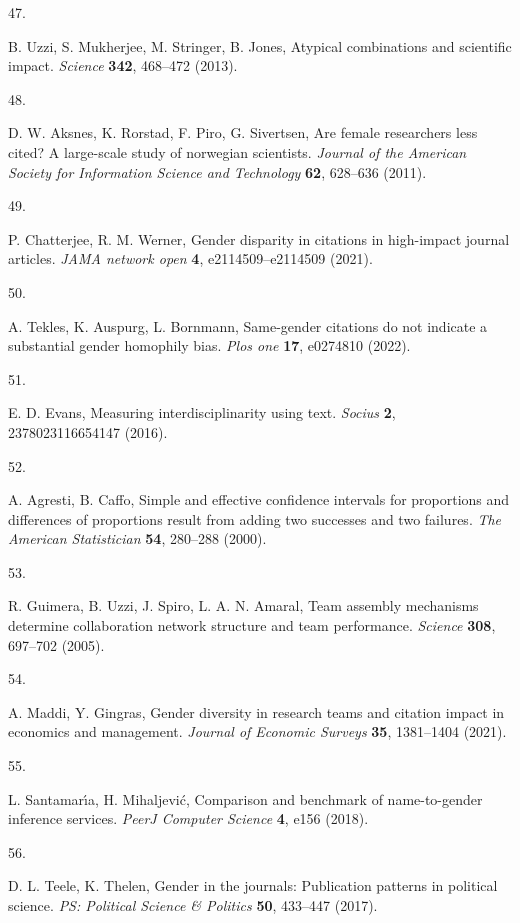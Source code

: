 \documentclass[
  11pt,
]{article}
\newlength{\cslhangindent}
\newlength{\csllabelwidth}
\newenvironment{CSLReferences}[2] %
 {\begin{list}{}{%
  \setlength{\itemindent}{0pt}
  \setlength{\leftmargin}{0pt}
  \setlength{\parsep}{0pt}
  \ifodd #1
   \setlength{\leftmargin}{\cslhangindent}
   \setlength{\itemindent}{-1\cslhangindent}
  \fi
  \setlength{\itemsep}{#2\baselineskip}}}
 {\end{list}}
\newcommand{\CSLLeftMargin}[1]{\parbox[t]{\csllabelwidth}{\strut#1\strut}}
\newcommand{\CSLRightInline}[1]{\parbox[t]{\linewidth - \csllabelwidth}{\strut#1\strut}}
\begin{document}
\begin{CSLReferences}{0}{1}
\CSLLeftMargin{47. }%
\CSLRightInline{B. Uzzi, S. Mukherjee, M. Stringer, B. Jones, Atypical combinations and scientific impact. \emph{Science} \textbf{342}, 468--472 (2013).}

\CSLLeftMargin{48. }%
\CSLRightInline{D. W. Aksnes, K. Rorstad, F. Piro, G. Sivertsen, Are female researchers less cited? A large-scale study of norwegian scientists. \emph{Journal of the American Society for Information Science and Technology} \textbf{62}, 628--636 (2011).}

\CSLLeftMargin{49. }%
\CSLRightInline{P. Chatterjee, R. M. Werner, Gender disparity in citations in high-impact journal articles. \emph{JAMA network open} \textbf{4}, e2114509--e2114509 (2021).}

\CSLLeftMargin{50. }%
\CSLRightInline{A. Tekles, K. Auspurg, L. Bornmann, Same-gender citations do not indicate a substantial gender homophily bias. \emph{Plos one} \textbf{17}, e0274810 (2022).}

\CSLLeftMargin{51. }%
\CSLRightInline{E. D. Evans, Measuring interdisciplinarity using text. \emph{Socius} \textbf{2}, 2378023116654147 (2016).}

\CSLLeftMargin{52. }%
\CSLRightInline{A. Agresti, B. Caffo, Simple and effective confidence intervals for proportions and differences of proportions result from adding two successes and two failures. \emph{The American Statistician} \textbf{54}, 280--288 (2000).}

\CSLLeftMargin{53. }%
\CSLRightInline{R. Guimera, B. Uzzi, J. Spiro, L. A. N. Amaral, Team assembly mechanisms determine collaboration network structure and team performance. \emph{Science} \textbf{308}, 697--702 (2005).}

\CSLLeftMargin{54. }%
\CSLRightInline{A. Maddi, Y. Gingras, Gender diversity in research teams and citation impact in economics and management. \emph{Journal of Economic Surveys} \textbf{35}, 1381--1404 (2021).}

\CSLLeftMargin{55. }%
\CSLRightInline{L. Santamarı́a, H. Mihaljević, Comparison and benchmark of name-to-gender inference services. \emph{PeerJ Computer Science} \textbf{4}, e156 (2018).}

\CSLLeftMargin{56. }%
\CSLRightInline{D. L. Teele, K. Thelen, Gender in the journals: Publication patterns in political science. \emph{PS: Political Science \& Politics} \textbf{50}, 433--447 (2017).}

\end{CSLReferences}
\end{document}

